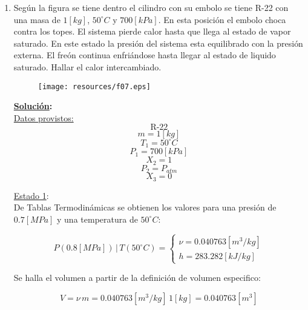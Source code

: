 \documentclass[letter,11pt]{article}
\begin{document}
\begin{enumerate}
\item Según la figura se tiene dentro el cilindro con su embolo se tiene R-22
con una masa de $1[kg]$, $50^\circ C$ y $700[kPa]$. En esta posición el embolo
choca contra los topes. El sistema pierde calor hasta que llega al estado de
vapor saturado. En este estado la presión del sistema esta equilibrado con la
presión externa. El freón continua enfriándose hasta llegar al estado de liquido
saturado. Hallar el calor intercambiado.

\begin{figure}[H]
\centering
\texttt{[image: resources/f07.eps]}
\end{figure}

\textbf{\underline{Solución}:} \\

\underline{Datos provistos:}
\begin{equation*}
    \text{R-22}
\end{equation*}
\begin{equation*}
    m = 1[kg]
\end{equation*}
\begin{equation*}
    T_1 = 50^\circ C
\end{equation*}
\begin{equation*}
    P_1= 700[kPa]
\end{equation*}
\begin{equation*}
    X_2 = 1
\end{equation*}
\begin{equation*}
    P_2 = P_{atm}
\end{equation*}
\begin{equation*}
    X_3 = 0
\end{equation*}

\underline{Estado 1}: \\
De Tablas Termodinámicas se obtienen los valores para una presión de
$0.7[MPa]$ y una temperatura de $50^\circ C$:

\begin{equation*}
    P(0.8[MPa])\,|\,T(50^\circ C) = \begin{cases}
        \nu = 0.040763[m^3/kg] \\
        h = 283.282[kJ/kg]
    \end{cases}
\end{equation*}

Se halla el volumen a partir de la definición de volumen especifico:

\begin{equation*}
    V = \nu\,m = 0.040763[m^3/kg]\,1[kg] = 0.040763[m^3]
\end{equation*}


\end{enumerate}
\end{document}
